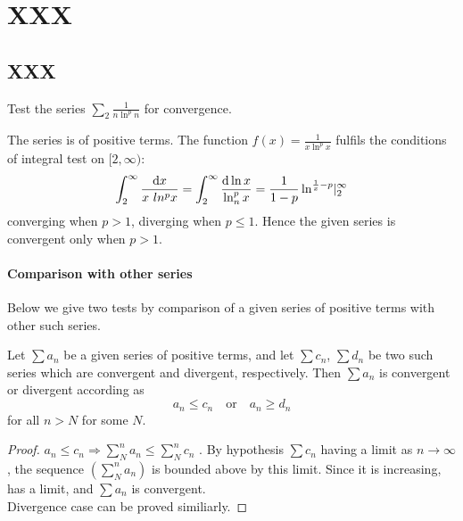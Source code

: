 \documentclass[11pt]{amsbook}
\begin{document}
\chapter{XXX}
\label{chap:FuncLimCont}




\section{XXX}
\label{sec:Numbers}


\begin{exmp}
Test the series $\sum_2 \frac{1}{n \ln^{p} n} $ for convergence.\\
	\begin{hSolution}
		The series is of positive terms. 
		The function $f(x) = \frac{1}{x \ln^{p} x}$ fulfils 
		the conditions of integral test on $[2, \infty)$:
		\[
			\int_{2}^{\infty} \frac{\mathrm{d} x}{x\ ln^{p} x}
			= \int_{2}^{\infty} \frac{\mathrm{d} \ln x}{\ln^{p}_{n} x}
			= \frac{1}{1 - p} \ln^{\frac{1}{x} - p} \lvert^{\infty}_{2}
		\]
		converging when $p>1$, 
		diverging when $p \le1$. 
		Hence the given series is convergent only when $p > 1$.
	\end{hSolution}
\end{exmp}




\subsubsection{Comparison with other series}

Below we give two tests by comparison of a given series of 
positive terms with other such series.
\begin{thm}
	\label{thm:TestByInequality}
	Let $\sum a_n$ be a given series of positive terms, and 
	let $\sum c_n$, $\sum d_n$ be two such series 
	which are convergent and divergent, respectively. 
	Then $\sum a_n$ is convergent or divergent according as
	\[
		a_n \le c_n \quad \text{or}  \quad a_n\ge d_n
	\]
	for all $n > N$ for some $N$.

	\begin{proof}
		$a_n \le c_n \Rightarrow \sum_N^n a_n \leq \sum_N^n c_n$ . 
		By hypothesis $\sum c_n$ having a limit as $n \rightarrow \infty $, 
		the sequence $(\sum_N^n a_n)$ is bounded above by this limit. 
		Since it is increasing, 
		has a limit, and $\sum a_n$ is convergent.\\
		Divergence case can be proved similiarly.
	\end{proof}
\end{thm}
\end{document}

